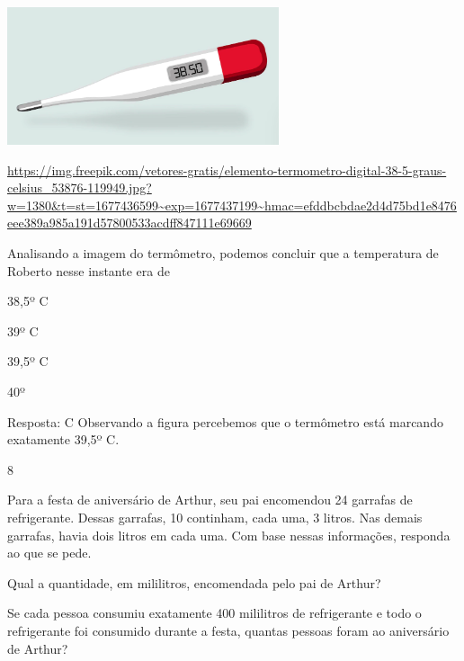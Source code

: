 \includegraphics[width=3.15000in,height=1.59426in]{media/image47.png}

\url{https://img.freepik.com/vetores-gratis/elemento-termometro-digital-38-5-graus-celsius_53876-119949.jpg?w=1380\&t=st=1677436599~exp=1677437199~hmac=efddbcbdae2d4d75bd1e8476eee389a985a191d57800533acdff847111e69669}


Analisando a imagem do termômetro, podemos concluir que a temperatura de Roberto nesse instante era de

\begin{escolha}

\item
  38,5º C
\item
  39º C
\item
  39,5º C
\item
  40º
\end{escolha}

Resposta: C
Observando a figura percebemos que o termômetro está marcando exatamente
39,5º C.

\num{8}

Para a festa de aniversário de Arthur, seu pai encomendou 24 garrafas de
refrigerante. Dessas garrafas, 10 continham, cada uma, 3 litros. Nas
demais garrafas, havia dois litros em cada uma. Com base nessas
informações, responda ao que se pede.

\begin{escolha}

\item
  Qual a quantidade, em mililitros, encomendada pelo pai de Arthur?

\item
  Se cada pessoa consumiu exatamente 400 mililitros de refrigerante e
  todo o refrigerante foi consumido durante a festa, quantas pessoas
  foram ao aniversário de Arthur?

\end{escolha}

